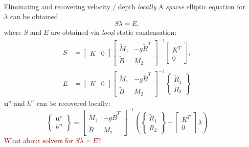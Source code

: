 \documentclass[9pt]{beamer}
\renewcommand\vec{\mathbf}
\begin{document}
\begin{frame}[c]{Eliminating and recovering velocity / depth \emph{locally}}
	A \emph{sparse} elliptic equation for $\lambda$
	can be obtained
	\begin{equation*}
		S\lambda = E,
	\end{equation*}
	where $S$ and $E$ are obtained via \emph{local} static
	condensation:
	\begin{align*}
		S &= \begin{bmatrix}
		K & 0
		\end{bmatrix}
		\begin{bmatrix}
		\tilde{M}_1 & -g\tilde{B}^T \\
		\tilde{B} & M_2
		\end{bmatrix}^{-1}
		\begin{bmatrix}
		K^T \\ 0
		\end{bmatrix}, \\
		E &= \begin{bmatrix}
		K & 0
		\end{bmatrix}
		\begin{bmatrix}
		\tilde{M}_1 & -g\tilde{B}^T \\
		\tilde{B} & M_2
		\end{bmatrix}^{-1}
		\begin{Bmatrix}
		\tilde{R}_1 \\ R_2
		\end{Bmatrix}
	\end{align*}
	$\vec{u}^n$ and $h^n$ can be recovered locally:
	\begin{equation*}
		\begin{Bmatrix}
		\vec{u}^n \\ h^n
		\end{Bmatrix}
		= \begin{bmatrix}
		\tilde{M}_1 & -g\tilde{B}^T \\
		\tilde{B} & M_2
		\end{bmatrix}^{-1}
		\left(
		\begin{Bmatrix}
		\tilde{R}_1 \\ R_2
		\end{Bmatrix} -
		\begin{bmatrix}
		K^T \\ 0
		\end{bmatrix}
		\lambda
		\right)
	\end{equation*}
	\textcolor{maroon}{What about solvers for $S\lambda = E$?}
\end{frame}
\end{document}
